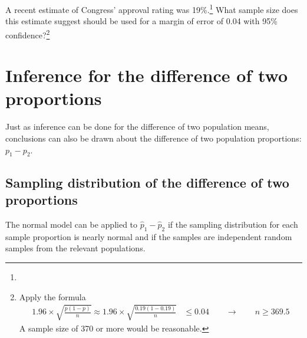 \begin{exercise}
A recent estimate of Congress' approval rating was 19\%.\footnote{} What sample size does this estimate suggest should be used for a margin of error of 0.04 with 95\% confidence?\footnote{Apply the formula \\
\begin{align*}
1.96\times \sqrt{\frac{p(1-p)}{n}} \approx
1.96\times \sqrt{\frac{0.19(1-0.19)}{n}} &\leq 0.04 \qquad\to\qquad n \geq 369.5
\end{align*}
A sample size of 370 or more would be reasonable.}


\end{exercise}


\section{Inference for the difference of two proportions}
\label{differenceOfTwoProportions}

Just as inference can be done for the difference of two population means, conclusions can also be drawn about the difference of two population proportions: $p_1 - p_2$. 

\subsection{Sampling distribution of the difference of two proportions}

The normal model can be applied to $\hat{p}_1 - \hat{p}_2$ if the sampling distribution for each sample proportion is nearly normal and if the samples are independent random samples from the relevant populations. 

